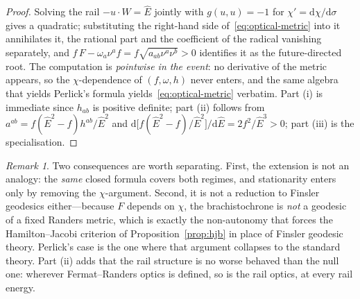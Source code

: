 \documentclass[12pt]{iopart}
\newcommand{\Ehat}{\hat E}
\newcommand{\dd}{\mathrm{d}}
\theoremstyle{plain}
\theoremstyle{definition}
\theoremstyle{plain}
\theoremstyle{remark}
\newtheorem*{remark}{Remark}
\begin{document}
\begin{proof}
Solving the rail $-u\cdot W=\Ehat$ jointly with $g(u,u)=-1$ for $\chi'=\dd\chi/\dd\sigma$
gives a quadratic; substituting the right-hand side of~\eqref{eq:optical-metric} into it
annihilates it, the rational part and the coefficient of the radical vanishing separately,
and $f\,F-\omega_a\nu^a f=f\sqrt{a_{ab}\nu^a\nu^b}>0$ identifies it as the
future-directed root. The computation is \emph{pointwise in the event}: no derivative of
the metric appears, so the $\chi$-dependence of $(f,\omega,h)$ never enters, and the same
algebra that yields Perlick's formula yields~\eqref{eq:optical-metric} verbatim. Part (i)
is immediate since $h_{ab}$ is positive definite; part (ii) follows from
$a^{ab}=f(\Ehat^2-f)h^{ab}/\Ehat^2$ and
$\dd\big[f(\Ehat^2-f)/\Ehat^2\big]/\dd\Ehat=2f^2/\Ehat^3>0$; part (iii) is the
specialisation.
\end{proof}

\begin{remark}
Two consequences are worth separating. First, the extension is not an analogy: the
\emph{same} closed formula covers both regimes, and stationarity enters only by removing
the $\chi$-argument. Second, it is not a reduction to Finsler geodesics either---because
$F$ depends on $\chi$, the brachistochrone is \emph{not} a geodesic of a fixed Randers
metric, which is exactly the non-autonomy that forces the Hamilton--Jacobi criterion of
Proposition~\ref{prop:hjb} in place of Finsler geodesic theory. Perlick's case is the one
where that argument collapses to the standard theory. Part (ii) adds that the rail
structure is no worse behaved than the null one: wherever Fermat--Randers optics is
defined, so is the rail optics, at every rail energy.
\end{remark}
\end{document}
